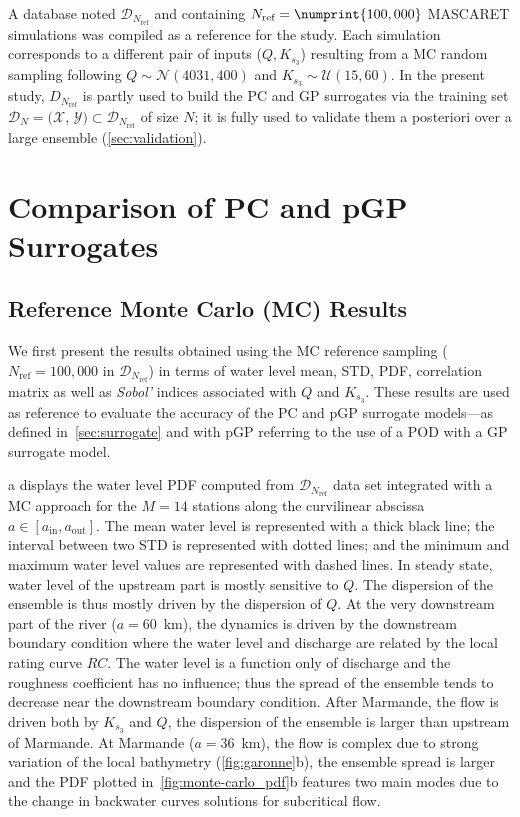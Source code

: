 A database noted $\mathcal{D}_{N_{\text{ref}}}$ and containing $N_{\text{ref}} = \numprint{100,000}$ MASCARET simulations was compiled as a reference for the study. Each simulation corresponds to a different pair of inputs ($Q, K_{s_3}$) resulting from a MC random sampling following $Q\sim\mathcal{N}(4031,400)$ and $K_{s_3} \sim \mathcal{U}(15,60)$. In the present study, $D_{N_{\text{ref}}}$ is partly used to build the PC and GP surrogates via the training set 
$\mathcal{D}_N = (\mathcal{X}$, $\mathcal{Y})\subset \mathcal{D}_{N_{\text{ref}}}$ of size $N$; it is fully used to validate them a posteriori over a large ensemble (\cref{sec:validation}).


\section{Comparison of PC and pGP Surrogates}\label{sec:UQresults}

\subsection{Reference Monte Carlo (MC) Results}
\label{sec:UQresults_ref}

We first present the results obtained using the MC reference sampling ($N_{\text{ref}} = 100,000$ in $\mathcal{D}_{N_{\text{ref}}}$) in terms of water level mean, STD, PDF, correlation matrix as well as \emph{Sobol'} indices associated with $Q$ and $K_{s_3}$. These results are used as reference to evaluate the accuracy of the PC and pGP surrogate models---as defined in~\cref{sec:surrogate} and with pGP referring to the use of a POD with a GP surrogate model.

a displays the water level PDF computed from $\mathcal{D}_{N_{\text{ref}}}$ data set integrated with a MC approach for the $M = 14$ stations along the curvilinear abscissa $a \in [a_{\text{in}}, a_{\text{out}}]$. The mean water level is represented with a thick black line; the interval between two STD is represented with dotted lines; and the minimum and maximum water level values are represented with dashed lines. In steady state, water level of the upstream part is mostly sensitive to $Q$. The dispersion of the ensemble is thus mostly driven by the dispersion of $Q$. At the very downstream part of the river ($a=60$~km), the dynamics is driven by the downstream boundary condition where the water level and discharge are related by the local rating curve $RC$. The water level is a function only of discharge and the roughness coefficient has no influence; thus the spread of the ensemble tends to decrease near the downstream boundary condition. After Marmande, the flow is driven both by $K_{s_3}$ and $Q$, the dispersion of the ensemble is larger than upstream of Marmande. At Marmande ($a = 36$~km), the flow is complex due to strong variation of the local bathymetry (\cref{fig:garonne}b), the ensemble spread is larger and the PDF plotted in~\cref{fig:monte-carlo_pdf}b features two main modes due to the change in backwater curves solutions for subcritical flow.
 
